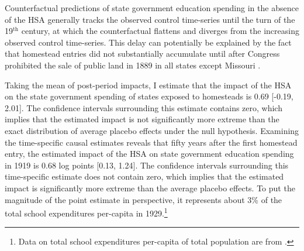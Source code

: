 \documentclass[hidelinks,12pt]{article}
\begin{document}
Counterfactual predictions of state government education spending in the absence of the HSA generally tracks the observed control time-series until the turn of the 19$^\text{th}$ century, at which the counterfactual flattens and diverges from the increasing observed control time-series. This delay can potentially be explained by the fact that homestead entries did not substantially accumulate until after Congress prohibited the sale of public land in 1889 in all states except Missouri \citep{gates1941land,gates1979federal}. 

Taking the mean of post-period impacts, I estimate that the impact of the HSA on the state government spending of states exposed to homesteads is 0.69 [-0.19, 2.01]. The confidence intervals surrounding this estimate contains zero, which implies that the estimated impact is not significantly more extreme than the exact distribution of average placebo effects under the null hypothesis. Examining the time-specific causal estimates reveals that fifty years after the first homestead entry, the estimated impact of the HSA on state government education spending in 1919 is 0.68 log points [0.13, 1.24]. The confidence intervals surrounding this time-specific estimate does not contain zero, which implies that the estimated impact is significantly more extreme than the average placebo effects. To put the magnitude of the point estimate in perspective, it represents about 3\% of the total school expenditures per-capita in 1929.\footnote{Data on total school expenditures per-capita of total population are from \citet{snyder2010digest}.}
 
\end{document}
